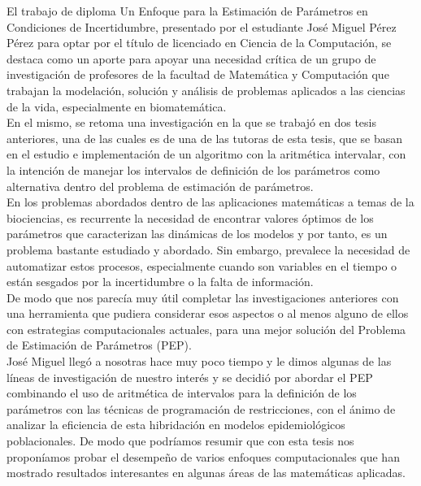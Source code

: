 \begin{opinion}

    El trabajo de diploma Un Enfoque para la Estimación de Parámetros en Condiciones
de Incertidumbre, presentado por el estudiante José Miguel Pérez Pérez para optar
por el título de licenciado en Ciencia de la Computación, se destaca como un aporte
para apoyar una necesidad crítica de un grupo de investigación de profesores de la
facultad de Matemática y Computación que trabajan la modelación, solución y análisis
de problemas aplicados a las ciencias de la vida, especialmente en biomatemática. \\

En el mismo, se retoma una investigación en la que se trabajó en dos tesis anteriores,
una de las cuales es de una de las tutoras de esta tesis, que se basan en el estudio e
implementación de un algoritmo con la aritmética intervalar, con la intención de
manejar los intervalos de definición de los parámetros como alternativa dentro del
problema de estimación de parámetros. \\

En los problemas abordados dentro de las aplicaciones matemáticas a temas de la
biociencias, es recurrente la necesidad de encontrar valores óptimos de los
parámetros que caracterizan las dinámicas de los modelos y por tanto, es un problema
bastante estudiado y abordado. Sin embargo, prevalece la necesidad de automatizar
estos procesos, especialmente cuando son variables en el tiempo o están sesgados
por la incertidumbre o la falta de información. \\

De modo que nos parecía muy útil completar las investigaciones anteriores con una
herramienta que pudiera considerar esos aspectos o al menos alguno de ellos con
estrategias computacionales actuales, para una mejor solución del Problema de
Estimación de Parámetros (PEP). \\

José Miguel llegó a nosotras hace muy poco tiempo y le dimos algunas de las líneas de
investigación de nuestro interés y se decidió por abordar el PEP combinando el uso de
aritmética de intervalos para la definición de los parámetros con las técnicas de
programación de restricciones, con el ánimo de analizar la eficiencia de esta
hibridación en modelos epidemiológicos poblacionales. De modo que podríamos
resumir que con esta tesis nos proponíamos probar el desempeño de varios enfoques
computacionales que han mostrado resultados interesantes en algunas áreas de las
matemáticas aplicadas. \\


\end{opinion}
